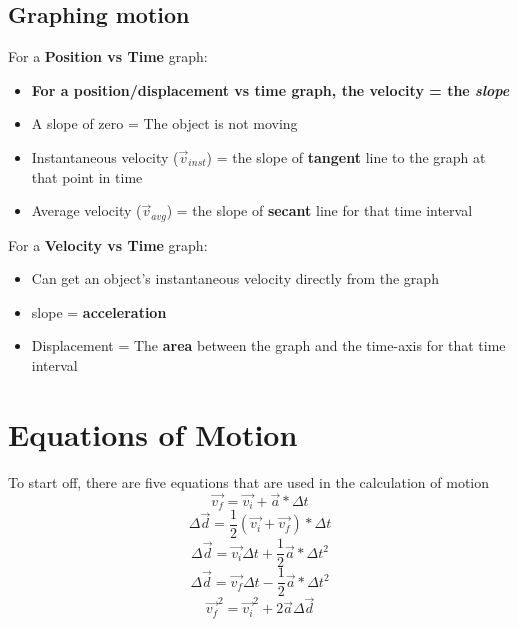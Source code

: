 \subsection{Graphing motion}
For a \textbf{Position vs Time} graph:
\begin{itemize}
\item \textbf{For a position/displacement vs time graph, the velocity = the \textit{slope}} 
\item A slope of zero = The object is not moving
\item Instantaneous velocity ($\vec{v}_{inst}$) = the slope of \textbf{tangent} line to the graph at that point in time
\item Average velocity ($\vec{v}_{avg}$) = the slope of \textbf{secant} line for that time interval
\end{itemize}
For a \textbf{Velocity vs Time} graph:
\begin{itemize}
    \item Can get an object's instantaneous velocity directly from the graph
    \item slope = \textbf{acceleration}
    \item Displacement = The \textbf{area} between the graph and the time-axis for that time interval
\end{itemize}

\newpage
\section{Equations of Motion}
To start off, there are five equations that are used in the calculation of motion
\[
    \vec{v_{f}} = \vec{v_{i}} + \vec{a}*\Delta t
\]
\[
    \Delta\vec{d} = \frac{1}{2}(\vec{v_{i}} + \vec{v_{f}}) * \Delta t
\]
\[
    \Delta\vec{d} = \vec{v_{i}}\Delta t + \frac{1}{2}\vec{a} * \Delta t^2
\]
\[
    \Delta\vec{d} = \vec{v_{f}}\Delta t - \frac{1}{2}\vec{a} * \Delta t^2
\]
\[
    \vec{v_{f}}^2 = \vec{v_{i}}^2 + 2 \vec{a} \Delta \vec{d} 
\]

